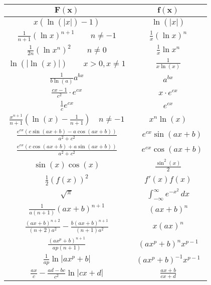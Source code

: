 \documentclass[a4paper, 10pt]{article}
\theoremstyle{definition}
\begin{document}
\begin{center}
\begin{tabular}{c|c}
    $\mathbf{F(x)}$ & $\mathbf{f(x)}$ \\
    \midrule
    $x  (\ln(|x|) - 1)$ & $\ln(|x|)$ \\
    $\frac{1}{n+1} (\ln x)^{n+1} \quad \quad n \neq -1 $ & $ \frac{1}{x}(\ln x)^n$ \\
    $\frac{1}{2n} (\ln x^n)^{2} \quad \quad n \neq 0 $ & $ \frac{1}{x}\ln x^n$ \\
    $\ln(|\ln(x)|) \quad \quad x > 0, x \neq 1$ & $\frac{1}{x \ln(x)}$ \\
    $\frac{1}{b \ln(a)} a^{bx}$ & $a^{bx}$ \\
    $\frac{cx - 1}{c^2} \cdot e^{cx}$ & $x \cdot e^{cx}$ \\
    $\frac{1}{c}e^{cx}$ & $e^{cx}$ \\
    $\frac{x^{n + 1}}{n + 1} \left(\ln(x) - \frac{1}{n + 1}\right) \quad n \neq -1 $ & $x^n \ln(x)$ \\
    $\frac{e^{cx} \left(c \sin(ax + b) - a \cos(ax + b) \right)}{a^2 + c^2}$ & $\quad e^{cx} \sin (ax + b) $ \\
    $\frac{e^{cx} \left(c \cos (ax + b) + a \sin(ax + b) \right)}{a^2 + c^2}$ & $\quad e^{cx} \cos (ax+b)$ \\
    $\sin(x)\cos(x)$ & $\frac{\sin^2(x)}{2}$ \\
    $\frac{1}{2}(f(x))^2$ & $f'(x) f(x)$ \\
    $\sqrt{\pi}$ & $\int_{-\infty}^\infty e^{-x^2} \,dx$ \\
    $\frac{1}{a(n+1)}(ax+b)^{n+1}$ & $(ax+b)^n$ \\
    $\frac{(ax+b)^{n+2}}{(n+2)a^2} - \frac{b(ax+b)^{n+1}}{(n+1)a^2}$ & $x(ax)^n$ \\
    $\frac{(ax^p+b)^{n+1}}{ap(n+1)}$ & $(ax^p+b)^n x^{p-1}$ \\
    $\frac{1}{ap} \ln |ax^p + b|$ & $(ax^p + b)^{-1} x^{p-1}$ \\
    $\frac{ax}{c} - \frac{ad-bc}{c^2} \ln |cx +d|$ & $\frac{ax+b}{cx+d}$ \\
\end{tabular}
\end{center}
\end{document}
